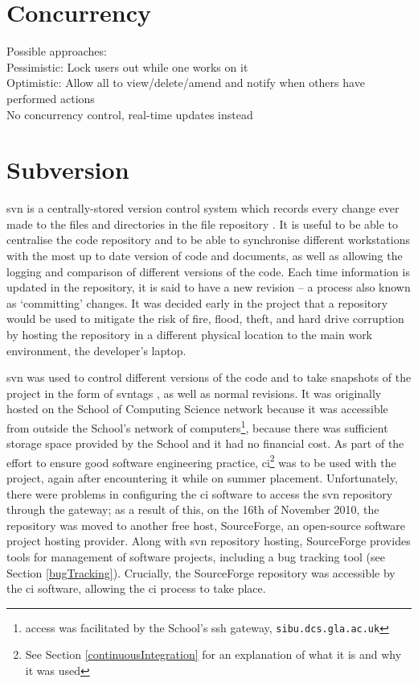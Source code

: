 \section{Concurrency}
\label{concurrency}
Possible approaches:\\
Pessimistic: Lock users out while one works on it \\
Optimistic: Allow all to view/delete/amend and notify when others have performed actions\\
No concurrency control, real-time updates instead

\section{Subversion}
\label{svn}
\gls{svn} is a centrally-stored version control system which records every change ever made to the files and directories in the file repository \cite{CFP04c1}.  It is useful to be able to centralise the code repository and to be able to synchronise different workstations with the most up to date version of code and documents, as well as allowing the logging and comparison of different versions of the code.  Each time information is updated in the repository, it is said to have a new revision -- a process also known as `committing' changes.  It was decided early in the project that a repository would be used to mitigate the risk of fire, flood, theft, and hard drive corruption by hosting the repository in a different physical location to the main work environment, the developer's laptop.  

\gls{svn} was used to control different versions of the code and to take snapshots of the project in the form of \gls{svntag}s \cite{CFP04c4}, as well as normal revisions.  It was originally hosted on the School of Computing Science network because it was accessible from outside the School's network of computers\footnote{access was facilitated by the School's \gls{ssh} gateway, \texttt{sibu.dcs.gla.ac.uk}}, because there was sufficient storage space provided by the School and it had no financial cost.  As part of the effort to ensure good software engineering practice, \gls{ci}\footnote{See Section \ref{continuousIntegration} for an explanation of what it is and why it was used} was to be used with the project, again after encountering it while on summer placement.  Unfortunately, there were problems in configuring the  \gls{ci}  software to access the \gls{svn} repository through the gateway; as a result of this, on the 16\^{th} of November 2010, the repository was moved to another free host, SourceForge, an open-source software project hosting provider.  Along with \gls{svn} repository hosting, SourceForge provides tools for management of software projects, including a bug tracking tool (see Section \ref{bugTracking}).  Crucially, the SourceForge repository was accessible by the \gls{ci} software, allowing the \gls{ci} process to take place.

